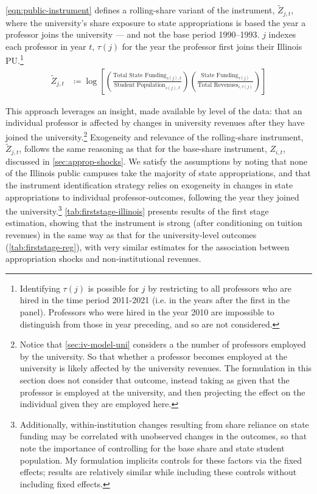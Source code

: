 \documentclass[notitlepage,12pt]{article}
\renewcommand{\tilde}[1]{\widetilde{#1}}                                   %
\begin{document}
\autoref{eqn:public-instrument} defines a rolling-share variant of the instrument, $\tilde Z_{j,t}$, where the university's share exposure to state appropriations is based the year a professor joins the university --- and not the base period 1990--1993.
$j$ indexes each professor in year $t$, $\tau(j)$ for the year the professor first joins their Illinois PU.\footnote{
    Identifying $\tau(j)$ is possible for $j$ by restricting to all professors who are hired in the time period 2011-2021 (i.e. in the years after the first in the panel).
    Professors who were hired in the year 2010 are impossible to distinguish from those in year preceding, and so are not considered.
}
\begin{align}
    \label{eqn:rolling-instrument}
    \tilde Z_{j,t} &\coloneqq \log \left[
    \left( \frac{\text{Total State Funding}_{s(j),t}}{\text{Student Population}_{s(j),t}} \right)
    \left( \frac{\text{State Funding}_{\tau(j)}}{\text{Total Revenues}_{i,\tau(j)}} \right) \right]
\end{align}

This approach leverages an insight, made available by level of the data: that an individual professor is affected by changes in university revenues after they have joined the university.\footnote{
    Notice that \autoref{sec:iv-model-uni} considers a the number of professors employed by the university.
    So that whether a professor becomes employed at the university is likely affected by the university revenues.
    The formulation in this section does not consider that outcome, instead taking as given that the professor is employed at the university, and then projecting the effect on the individual given they are employed here.
}
Exogeneity and relevance of the rolling-share instrument, $\tilde Z_{j,t}$, follows the same reasoning as that for the base-share instrument, $Z_{i,t}$, discussed in \autoref{sec:approp-shocks}.
We satisfy the assumptions by noting that none of the Illinois public campuses take the majority of state appropriations, and that the instrument identification strategy relies on exogeneity in changes in state appropriations to individual professor-outcomes, following the year they joined the university.\footnote{
    Additionally, within-institution changes resulting from share reliance on state funding may be correlated with unobserved changes in the outcomes, so that \cite{NBERw27885} note the importance of controlling for the base share and state student population.
    My formulation implicits controls for these factors via the fixed effects; results are relatively similar while including these controls without including fixed effects.
}
\autoref{tab:firststage-illinois} presents results of the first stage estimation, showing that the instrument is strong (after conditioning on tuition revenues) in the same way as that for the university-level outcomes (\autoref{tab:firststage-reg}), with very similar estimates for the association between appropriation shocks and non-institutional revenues.
\end{document}
